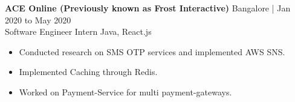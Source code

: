 \documentclass[11pt]{article}
\newcommand{\job}[4]{
    \begingroup
        \textbf{\small#1}
        \hfill\color{black!70}\small{#3}
        \\
        \small#2
        \hfill\color{black!70}\small{#4}
    \endgroup
}
\begin{document}
\begin{paracol}{2}
{      \job{ACE Online (Previously known as Frost Interactive)}{Software Engineer Intern}{Bangalore | Jan 2020 to May 2020}{Java, React.js}{}\\
      \begin{itemize}
        \item Conducted research on SMS OTP services and implemented AWS SNS.
        \item Implemented Caching through Redis.
        \item Worked on Payment-Service for multi payment-gateways.
      \end{itemize}
      \vspace{4mm}



      
    }


    \end{paracol}
\end{document}
